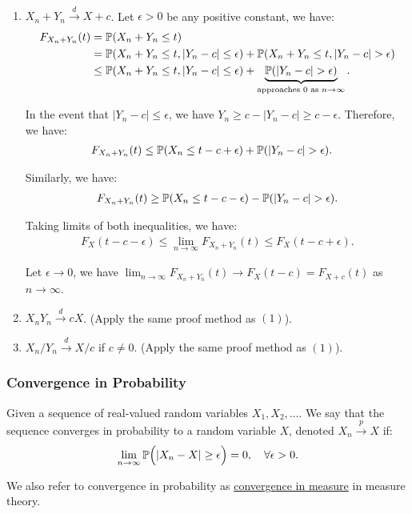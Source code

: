 \begin{proof*}
\ \begin{enumerate}     
    \item $X_n + Y_n \xrightarrow{d} X + c$.
    Let $\epsilon>0$ be any positive constant, we have:
    \begin{align*}
        F_{X_n+Y_n}(t) &= \mathbb{P}(X_n + Y_n \le t) \\ 
            &= \mathbb{P}(X_n + Y_n \le t, |Y_n - c| \le \epsilon) + \mathbb{P}(X_n + Y_n \le t, |Y_n - c| > \epsilon) \\
            &\le \mathbb{P}(X_n + Y_n \le t, |Y_n - c| \le \epsilon) + \underbrace{\mathbb{P}(|Y_n - c| > \epsilon)}_{\text{approaches } 0 \text{ as } n\to\infty}.
    \end{align*} 

    \noindent In the event that $|Y_n - c| \le \epsilon$, we have $Y_n \ge c - |Y_n - c| \ge c - \epsilon$. Therefore, we have:
    \begin{align*}
        F_{X_n + Y_n}(t) &\le \Pm(X_n \le t - c + \epsilon) + \Pm(|Y_n - c|>\epsilon).
    \end{align*} 

    \noindent Similarly, we have:
    \begin{align*}
         F_{X_n + Y_n}(t) \ge \mathbb{P}(X_n \le t - c - \epsilon) - \mathbb{P}(|Y_n - c| > \epsilon).
    \end{align*} 

    \noindent Taking limits of both inequalities, we have:
    \begin{align*}
        F_{X}(t - c - \epsilon) \le \lim_{n\to\infty} F_{X_n + Y_n}(t) \le F_X(t - c + \epsilon). 
    \end{align*} 

    \noindent Let $\epsilon\to0$, we have $\lim_{n\to\infty}F_{X_n+Y_n}(t) \to F_X(t - c) = F_{X+c}(t)$ as $n\to\infty$.
    \item $X_nY_n \xrightarrow{d} cX$. (Apply the same proof method as $(1)$).
    \item $X_n/Y_n \xrightarrow{d} X/c$ if $c \ne 0$. (Apply the same proof method as $(1)$). 
\end{enumerate} 
\end{proof*} 

\subsubsection{Convergence in Probability}
\begin{definition}
    Given a sequence of real-valued random variables $X_1, X_2, \dots$. We say that the sequence converges in probability to a random variable $X$, denoted $X_n\xrightarrow{p}X$ if:
    \begin{equation}
        \lim_{n\to\infty} \mathbb{P}\Big( |X_n - X| \ge \epsilon \Big) = 0, \quad \forall \epsilon > 0.
    \end{equation}

    \noindent We also refer to convergence in probability as \underline{convergence in measure} in measure theory.
\end{definition}

